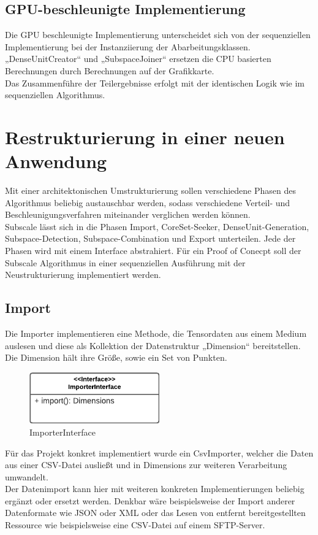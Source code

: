 \subsection{GPU-beschleunigte Implementierung}
Die GPU beschleunigte Implementierung unterscheidet sich von der sequenziellen Implementierung bei der Instanziierung
der Abarbeitungsklassen. „DenseUnitCreator“ und „SubspaceJoiner“ ersetzen die CPU basierten Berechnungen durch
Berechnungen auf der Grafikkarte.\\
Das Zusammenführe der Teilergebnisse erfolgt mit der identischen Logik wie im sequenziellen Algorithmus.

\section{Restrukturierung in einer neuen Anwendung}
Mit einer architektonischen Umstrukturierung sollen verschiedene Phasen des Algorithmus beliebig austauschbar werden,
sodass verschiedene Verteil- und Beschleunigungsverfahren miteinander verglichen werden können.\\
Subscale lässt sich in die Phasen Import, CoreSet-Seeker, DenseUnit-Generation, Subspace-Detection, Subspace-Combination
und Export unterteilen. Jede der Phasen wird mit einem Interface abstrahiert. Für ein Proof of Conecpt soll der Subscale
Algorithmus in einer sequenziellen Ausführung mit der Neustrukturierung implementiert werden.

\subsection{Import}
Die Importer implementieren eine Methode, die Tensordaten aus einem Medium auslesen und diese als Kollektion der
Datenstruktur „Dimension“ bereitstellen. Die Dimension hält ihre Größe, sowie ein Set von Punkten.
\begin{figure}[h]
	\centering
	\includegraphics[width=0.5\textwidth]{./Bilder/Restrukturierung/Importer.png}
	\caption{ImporterInterface}
\end{figure}
Für das Projekt konkret implementiert wurde ein CsvImporter, welcher die Daten aus einer CSV-Datei ausließt und in
Dimensions zur weiteren Verarbeitung umwandelt.\\
Der Datenimport kann hier mit weiteren konkreten Implementierungen beliebig ergänzt oder ersetzt werden. Denkbar wäre
beispielsweise der Import anderer Datenformate wie JSON oder XML oder das Lesen von entfernt bereitgestellten Ressource
wie beispielsweise eine CSV-Datei auf einem SFTP-Server.

